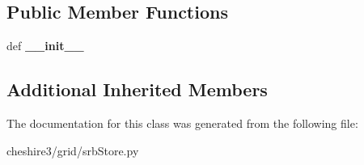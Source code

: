 \subsection*{Public Member Functions}
\begin{DoxyCompactItemize}
\item 
\hypertarget{classcheshire3_1_1grid_1_1srb_store_1_1_caching_srb_record_store_a02900c135f3732f404d4af0dfe7bee45}{def {\bfseries \-\_\-\-\_\-init\-\_\-\-\_\-}}\label{classcheshire3_1_1grid_1_1srb_store_1_1_caching_srb_record_store_a02900c135f3732f404d4af0dfe7bee45}

\end{DoxyCompactItemize}
\subsection*{Additional Inherited Members}


The documentation for this class was generated from the following file\-:\begin{DoxyCompactItemize}
\item 
cheshire3/grid/srb\-Store.\-py\end{DoxyCompactItemize}
